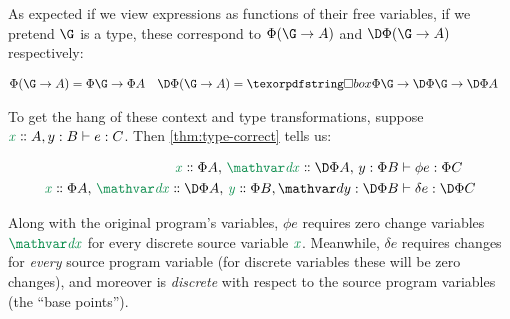 
\noindent As expected if we view expressions as functions of their free
variables, if we pretend $\G$ is a type, these correspond to $\Phi(\G \to A)$
and $\DP(\G \to A)$ respectively:

\begin{align*}
  \Phi(\G \to A) &= \Phi\G \to \Phi A
  & \DP(\G \to A) &= \iso\Phi\G \to \DP\G \to \DP A
\end{align*}

\noindent
To get the hang of these context and type transformations, suppose $\J
e {\hd x A, \h y B} C$. Then \cref{thm:type-correct} tells us:

\nopagebreak[1]
\begin{align*}
  \Jalign{\phi e} {\hd x{\Phi A},\, \hd \dx {\DP A},\, \h y {\Phi B}} {\Phi C}
  \\
  \Jalign{\delta e} {\hd x{\Phi A},\, \hd\dx{\DP A},\, \hd y{\Phi B}, \h\dy{\DP B}} {\DP C}
\end{align*}


\noindent
Along with the original program's variables, $\phi e$ requires zero change
variables $\dvar\dx$ for every discrete source variable $\dvar x$. Meanwhile,
$\delta e$ requires changes for \emph{every} source program variable (for
discrete variables these will be zero changes), and moreover is \emph{discrete}
with respect to the source program variables (the ``base points'').

